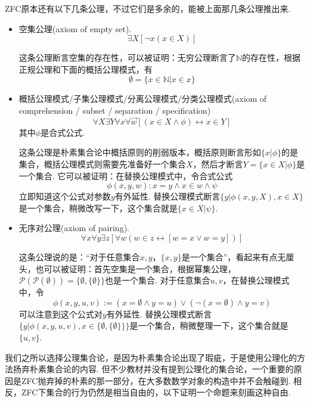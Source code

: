 \documentclass[main.tex]{subfiles}
\begin{document}
\textsf{ZFC}原本还有以下几条公理，不过它们是多余的，能被上面那几条公理推出来. 
\begin{itemize}
    \item  空集公理(axiom of empty set).
    \[\exists X[\neg x(x \in X)]\]
    \begin{note}
        这条公理断言空集的存在性，可以被证明：无穷公理断言了\(\mathbb{N}\)的存在性，根据正规公理和下面的概括公理模式，有
        \[\emptyset = \{x \in \mathbb{N}|x \in x\}\]
    \end{note}
    \item  概括公理模式/子集公理模式/分离公理模式/分类公理模式(axiom of comprehension / subset / separation / specification)
    \[\forall X \exists Y \forall x \forall \vec{w}[(x \in X \wedge \phi) \leftrightarrow x \in Y]\]
    其中\(\phi\)是合式公式.
    \begin{note}
        这条公理是朴素集合论中概括原则的削弱版本，概括原则断言形如\(\{x|\phi\}\)的是集合，概括公理模式则需要先准备好一个集合\(X\)，然后才断言\(Y = \{x \in X|\phi\}\)是一个集合. 它可以被证明：在替换公理模式中，令合式公式
        \[\phi(x,y,w) : x=y \wedge x \in w \wedge \psi\]
        立即知道这个公式对参数\(y\)有外延性. 替换公理模式断言\(\{y|\phi(x,y,X), x \in X\}\)是一个集合，稍微改写一下，这个集合就是\(\{x \in X| \psi\}\).
    \end{note}
    \item  无序对公理(axiom of pairing).
    \[\forall x \forall y \exists z[\forall w(w \in z \leftrightarrow [w=x \vee w=y])]\]
    \begin{note}
        这条公理说的是：“对于任意集合\(x,y\)，\(\{x,y\}\)是一个集合”，看起来有点无厘头，也可以被证明：首先空集是一个集合，根据幂集公理，\(\mathcal{P}(\mathcal{P}(\emptyset)) = \{\emptyset,\{\emptyset\}\}\)也是一个集合. 对于任意集合\(u,v\)，在替换公理模式中，令
        \[\phi(x,y,u,v) := (x = \emptyset \wedge y = u) \vee (\neg (x =\emptyset) \wedge y = v)\]
        可以注意到这个公式对\(y\)有外延性. 替换公理模式断言\(\{y | \phi(x,y,u,v), x \in \{\emptyset,\{\emptyset\}\}\}\)是一个集合，稍微整理一下，这个集合就是\(\{u,v\}\).
    \end{note}
\end{itemize}

我们之所以选择公理集合论，是因为朴素集合论出现了瑕疵，于是使用公理化的方法扬弃朴素集合论的内容. 但不少教材并没有提到公理化的集合论，一个重要的原因是\textsf{ZFC}抛弃掉的朴素的那一部分，在大多数数学对象的构造中并不会触碰到. 相反，\textsf{ZFC}下集合的行为仍然是相当自由的，以下证明一个命题来刻画这种自由.
\end{document}

